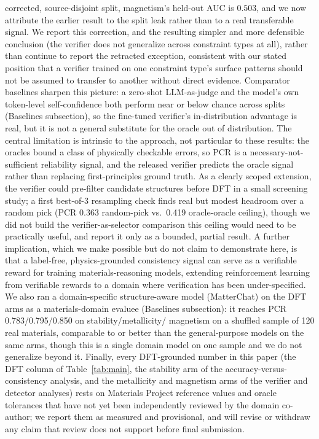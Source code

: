 \documentclass[pdflatex,sn-nature]{sn-jnl}
\begin{document}
corrected, source-disjoint split, magnetism's held-out AUC is $0.503$, and we now attribute
the earlier result to the split leak rather than to a real transferable signal. We report
this correction, and the resulting simpler and more defensible conclusion (the verifier does
not generalize across constraint types at all), rather than continue to report the
retracted exception, consistent with our stated position that a verifier trained on one
constraint type's surface patterns should not be assumed to transfer to another
without direct evidence. Comparator baselines sharpen this picture: a zero-shot LLM-as-judge
and the model's own token-level self-confidence both perform near or below chance across
splits (Baselines subsection), so the fine-tuned verifier's in-distribution advantage is
real, but it is not a general substitute for the oracle out of distribution. The central limitation is intrinsic to the approach, not
particular to these results: the oracles bound a class of physically checkable
errors, so PCR is a necessary-not-sufficient reliability signal, and the released
verifier predicts the oracle signal rather than replacing first-principles ground
truth. As a clearly scoped extension, the verifier could pre-filter candidate
structures before DFT in a small screening study; a first best-of-3 resampling check finds
real but modest headroom over a random pick (PCR 0.363 random-pick vs.\ 0.419 oracle-oracle
ceiling), though we did not build the verifier-as-selector comparison this ceiling would
need to be practically useful, and report it only as a bounded, partial result. A further implication,
which we make possible but do not claim to demonstrate here, is that a label-free,
physics-grounded consistency signal can serve as a verifiable reward for training
materials-reasoning models, extending reinforcement learning from verifiable rewards
to a domain where verification has been under-specified.\cite{scirlvr2026} We also ran a
domain-specific structure-aware model (MatterChat) on the DFT arms as a materials-domain
evaluee (Baselines subsection): it reaches PCR 0.783/0.795/0.850 on stability/metallicity/
magnetism on a shuffled sample of 120 real materials, comparable to or better than the
general-purpose models on the same arms, though this is a single domain model on one
sample and we do not generalize beyond it. Finally,
every DFT-grounded number in this paper (the DFT column of Table~\ref{tab:main}, the
stability arm of the accuracy-versus-consistency analysis, and the metallicity and
magnetism arms of the verifier and detector analyses) rests on Materials Project
reference values and oracle tolerances that have not yet been independently reviewed
by the domain co-author; we report them as measured and provisional, and will revise
or withdraw any claim that review does not support before final submission.
\end{document}
